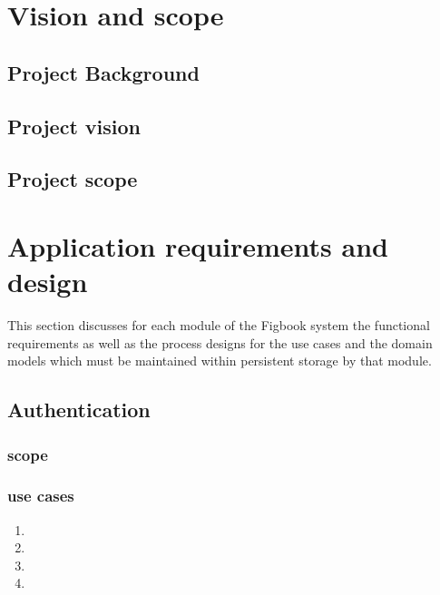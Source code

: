 \documentclass[12pt]{article}
\begin{document}


\newpage
\tableofcontents

\newpage

\section{Vision and scope}

\subsection{Project Background}

\subsection{Project vision}

\subsection{Project scope}

\section{Application requirements and design}
\par{This section discusses for each module of the Figbook system the functional requirements
as well as the process designs for the use cases and the domain models which must be maintained
within persistent storage by that module.
}

\subsection{Authentication}

\subsubsection{scope}

\subsubsection{use cases}

\begin{enumerate}

\item
\item
\item
\item
\end{enumerate}
\end{document}
